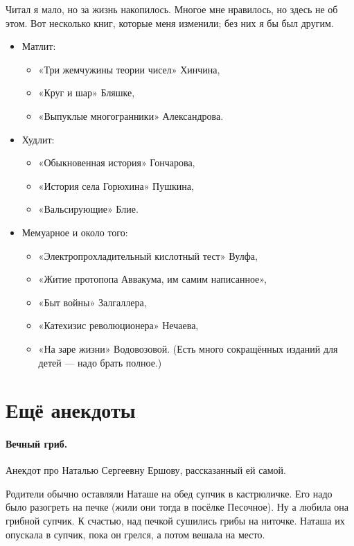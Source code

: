 \documentclass{book}
\begin{document}
Читал я мало, но за жизнь накопилось.
Многое мне нравилось, но здесь не об этом.
Вот несколько книг, которые меня изменили; без них я бы был другим.
\begin{itemize}
\item Матлит:
\begin{itemize}
\item «Три жемчужины теории чисел» Хинчина,
\item «Круг и шар» Бляшке,
\item «Выпуклые многогранники» Александрова.
\end{itemize}

\item Худлит:
\begin{itemize}
\item «Обыкновенная история» Гончарова,
\item «История села Горюхина» Пушкина,
\item «Вальсирующие» Блие.
\end{itemize}

\item Мемуарное и около того:
\begin{itemize}
\item «Электропрохладительный кислотный тест» Вулфа,
\item «Житие протопопа Аввакума, им самим написанное»,
\item «Быт войны» Залгаллера,
\item «Катехизис революционера» Нечаева,
\item «На заре жизни» Водовозовой. (Есть много сокращённых изданий для детей --- надо брать полное.)
\end{itemize} 

\end{itemize}

\section*{Ещё анекдоты}

\paragraph{Вечный гриб.}
Анекдот про Наталью Сергеевну Ершову, рассказанный ей самой.

Родители обычно оставляли Наташе на обед супчик в кастрюличке.
Его надо было разогреть на печке (жили они тогда в посёлке Песочное).
Ну а любила она грибной супчик.
К счастью, над печкой сушились грибы на ниточке.
Наташа их опускала в супчик, пока он грелся, а потом вешала на место.
\end{document}
